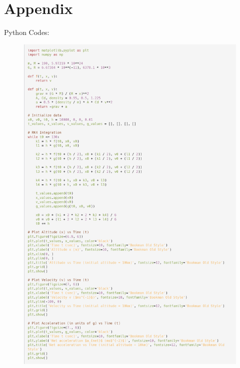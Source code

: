 \documentclass[a4paper, 14pt]{extarticle}
\begin{document}
\section*{Appendix}
Python Codes:
\begin{figure}[H]
\centering
\includegraphics[width=0.77\linewidth]{1.png}
\caption*{}
\end{figure}
\end{document}

